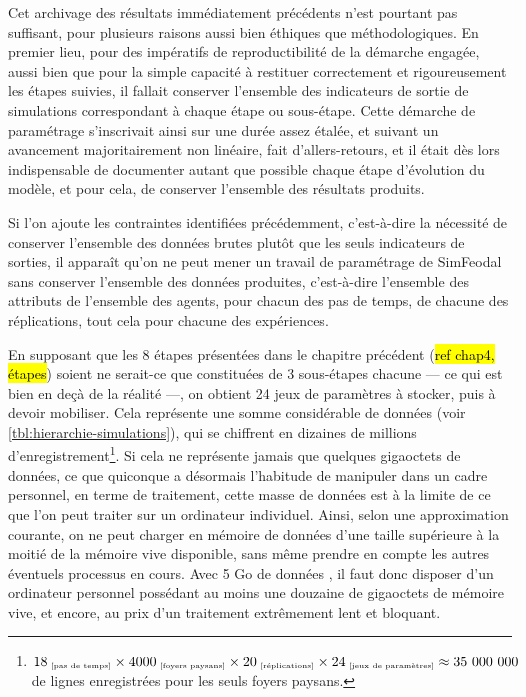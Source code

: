 	Cet archivage des résultats immédiatement précédents n'est pourtant pas suffisant, pour plusieurs raisons aussi bien éthiques que méthodologiques.
	En premier lieu, pour des impératifs de reproductibilité de la démarche engagée, aussi bien que pour la simple capacité à restituer correctement et rigoureusement les étapes suivies, il fallait conserver l'ensemble des indicateurs de sortie de simulations correspondant à chaque étape ou sous-étape.
	Cette démarche de paramétrage s'inscrivait ainsi sur une durée assez étalée, et suivant un avancement majoritairement non linéaire, fait d'allers-retours, et il était dès lors indispensable de documenter autant que possible chaque étape d'évolution du modèle, et pour cela, de conserver l'ensemble des résultats produits.
	
	Si l'on ajoute les contraintes identifiées précédemment, c'est-à-dire la nécessité de conserver l'ensemble des données brutes plutôt que les seuls indicateurs de sorties, il apparaît qu'on ne peut mener un travail de paramétrage de SimFeodal sans conserver l'ensemble des données produites, c'est-à-dire l'ensemble des attributs de l'ensemble des agents, pour chacun des pas de temps, de chacune des réplications, tout cela pour chacune des expériences.

	En supposant que les 8 étapes présentées dans le chapitre précédent (\hl{ref chap4, étapes}) soient ne serait-ce que constituées de 3 sous-étapes chacune --- ce qui est bien en deçà de la réalité ---, on obtient 24 jeux de paramètres à stocker, puis à devoir mobiliser.
	Cela représente une somme considérable de données (voir \cref{tbl:hierarchie-simulations}), qui se chiffrent en dizaines de millions d'enregistrement\footnote{
	$18_{\text{\tiny ~[pas de temps]}} \times 4000_{\text{\tiny ~[foyers paysans]}} \times 20_{\text{\tiny ~[réplications]}} \times 24_{\text{\tiny ~[jeux de paramètres]}} \approx 35~000~000$ de lignes enregistrées pour les seuls foyers paysans.
	}.
	Si cela ne représente jamais que quelques gigaoctets de données, ce que quiconque a désormais l'habitude de manipuler dans un cadre personnel, en terme de traitement, cette masse de données est à la limite de ce que l'on peut traiter sur un ordinateur individuel.
	Ainsi, selon une approximation courante, on ne peut charger en mémoire de données d'une taille supérieure à la moitié de la mémoire vive disponible, sans même prendre en compte les autres éventuels processus en cours.
	Avec 5 Go de données , il faut donc disposer d'un ordinateur personnel possédant au moins une douzaine de gigaoctets de mémoire vive, et encore, au prix d'un traitement extrêmement lent et bloquant.

